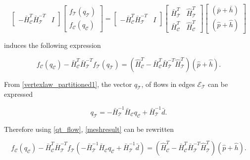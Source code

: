 \begin{equation}
\label{ohmslaw_matrixform_B}
\begin{bmatrix} 
-\bar{H}^T_{\mathcal{C}}\bar{H}^{-T}_{\mathcal{T}} & I 
\end{bmatrix}
 \begin{bmatrix} 
 f_{\mathcal{T}}(q_\mathcal{T}) \\[3pt] 
 f_{\mathcal{C}}(q_\mathcal{C}) 
 \end{bmatrix}
 =
 \begin{bmatrix} 
-\bar{H}^T_{\mathcal{C}}\bar{H}^{-T}_{\mathcal{T}} & I 
\end{bmatrix}
  \begin{bmatrix}
   \bar{H}^T_{\mathcal{T}} & \hat{H}^T_{\mathcal{T}} \\[3pt]
   \bar{H}^T_{\mathcal{C}} & \hat{H}^T_{\mathcal{C}} 
   \end{bmatrix}
   \begin{bmatrix} 
 (\bar{p} + \bar{h}) \\[3pt]
 (\hat{p} + \hat{h}) 
 \end{bmatrix}
\end{equation}

induces the following expression

\begin{equation}
\label{meshresult}
f_{\mathcal{C}}(q_\mathcal{C}) -\bar{H}^T_{\mathcal{C}}\bar{H}^{-T}_{\mathcal{T}} f_{\mathcal{T}}(q_\mathcal{T}) = (\hat{H}^T_{\mathcal{C}} -\bar{H}^T_{\mathcal{C}}\bar{H}^{-T}_{\mathcal{T}}\hat{H}^T_{\mathcal{T}})(\hat{p} + \hat{h}).
\end{equation}

From \eqref{vertexlaw_partitioned1}, the vector $q_{\mathcal{T}}$, of flows in edges $\mathcal{E}_{\mathcal{T}}$ can be expressed

\begin{equation}
\label{qt_flow}
q_{\mathcal{T}} = -\bar{H}^{-1}_{\mathcal{T}} \bar{H}_{\mathcal{C}} q_\mathcal{C} + \bar{H}^{-1}_{\mathcal{T}} \bar{d}.
\end{equation}

Therefore using \eqref{qt_flow}, \eqref{meshresult} can be rewritten

\begin{equation}
\label{meshresult2}
f_{\mathcal{C}}(q_\mathcal{C}) -\bar{H}^T_{\mathcal{C}}\bar{H}^{-T}_{\mathcal{T}} f_{\mathcal{T}}(-\bar{H}^{-1}_{\mathcal{T}} \bar{H}_{\mathcal{C}} q_\mathcal{C} + \bar{H}^{-1}_{\mathcal{T}} \bar{d}) = (\hat{H}^T_{\mathcal{C}} -\bar{H}^T_{\mathcal{C}}\bar{H}^{-T}_{\mathcal{T}}\hat{H}^T_{\mathcal{T}})(\hat{p} + \hat{h}).
\end{equation} 

